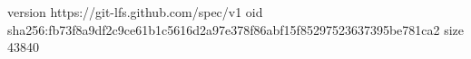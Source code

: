 version https://git-lfs.github.com/spec/v1
oid sha256:fb73f8a9df2c9ce61b1c5616d2a97e378f86abf15f85297523637395be781ca2
size 43840
